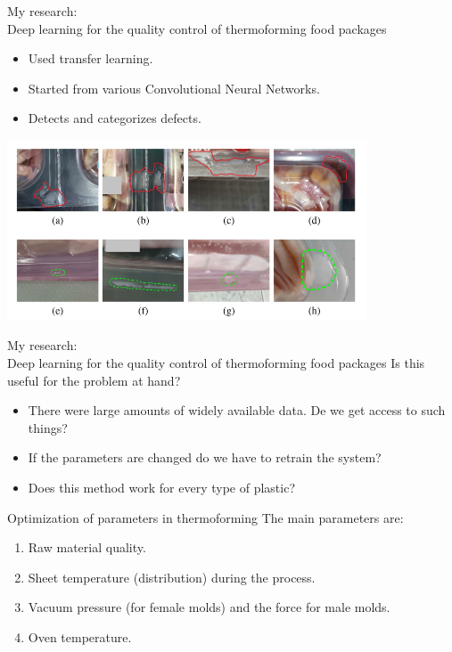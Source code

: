 \documentclass{beamer}
\begin{document}
	\begin{frame}{My research:\\Deep learning for the quality control of thermoforming food packages}
		\begin{itemize}
			\item Used transfer learning.
			\item Started from various Convolutional Neural Networks.
			\item Detects and categorizes defects.
		\end{itemize}
		\centering
		\includegraphics[width=0.8\textwidth]{Figures/DefectsOfPlastic.pdf}
	\end{frame}
	
	\begin{frame}{My research:\\Deep learning for the quality control of thermoforming food packages}
		Is this useful for the problem at hand?
		\pause
		\begin{itemize}
			\item There were large amounts of widely available data. De we get access to such things?
			\pause
			\item If the parameters are changed do we have to retrain the system?
			\pause
			\item Does this method work for every type of plastic?
		\end{itemize}
	\end{frame}

	\begin{frame}{Optimization of parameters in thermoforming}
		The main parameters are:
		\begin{enumerate}
			\item Raw material quality.
			\item Sheet temperature (distribution) during the process.
			\item Vacuum pressure (for female molds) and the force for male molds.
			\item Oven temperature.
		\end{enumerate}
	\end{frame}
	
	\begin{frame}
		\printbibliography
	\end{frame} 
\end{document}

